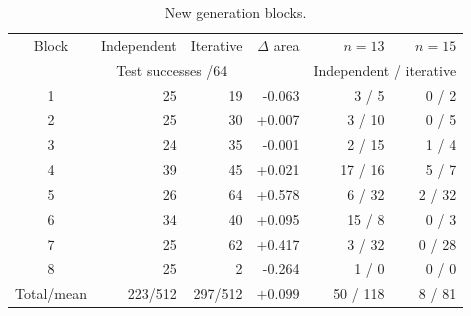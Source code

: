 \begin{table}[!htbp]
\centering\small
\setlength{\tabcolsep}{5pt}
\begin{tabular}{crrrrr}
\toprule
Block & Independent & Iterative & $\Delta$ area & $n=13$ & $n=15$\\
 & \multicolumn{2}{c}{Test successes /64} & & \multicolumn{2}{c}{Independent / iterative}\\
\midrule
1 & 25 & 19 & -0.063 & 3 / 5 & 0 / 2\\
2 & 25 & 30 & +0.007 & 3 / 10 & 0 / 5\\
3 & 24 & 35 & -0.001 & 2 / 15 & 1 / 4\\
4 & 39 & 45 & +0.021 & 17 / 16 & 5 / 7\\
5 & 26 & 64 & +0.578 & 6 / 32 & 2 / 32\\
6 & 34 & 40 & +0.095 & 15 / 8 & 0 / 3\\
7 & 25 & 62 & +0.417 & 3 / 32 & 0 / 28\\
8 & 25 & 2 & -0.264 & 1 / 0 & 0 / 0\\
\midrule
Total/mean & 223/512 & 297/512 & $+0.099$ & 50 / 118 & 8 / 81\\
\bottomrule
\end{tabular}
\caption{New generation blocks.}\label{tab:replication-blocks}
\end{table}
